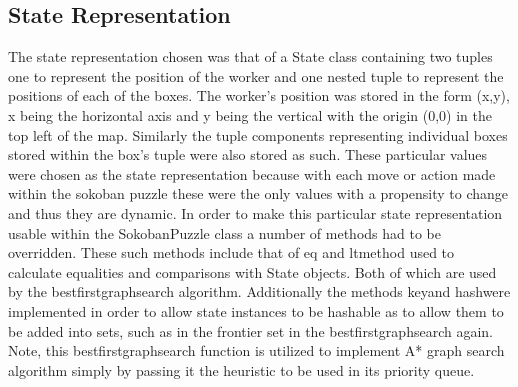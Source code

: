 \documentclass[a4paper,12pt]{article}
\begin{document}
\subsection{State Representation}
The state representation chosen was that of a State class containing two tuples one to  represent the position of the worker and one nested tuple to represent the positions of each of the boxes. The worker's position was stored in the form (x,y), x being the horizontal axis and y being the vertical with the origin (0,0) in the top left of the map. Similarly the tuple components representing individual boxes stored within the box's tuple were also stored as such. These particular values were chosen as the state representation because with each move or action made within the sokoban puzzle these were the only values with a propensity to change and thus they are dynamic. In order to make this particular state representation usable within the SokobanPuzzle class a number of methods had to be overridden. These such methods include that of \textunderscore eq \textunderscore and \textunderscore lt\textunderscore method used to calculate equalities and comparisons with State objects. Both of which are used by the best\textunderscore first\textunderscore graph\textunderscore search algorithm. Additionally the methods \textunderscore key\textunderscore  and \textunderscore hash\textunderscore  were implemented in order to allow state instances to be hashable as to allow them to be added into sets, such as in the frontier set in the best\textunderscore first\textunderscore graph\textunderscore search again. Note, this best\textunderscore first\textunderscore graph\textunderscore search function is utilized to implement A* graph search algorithm simply by passing it the heuristic to be used in its priority queue.
 
\end{document}
